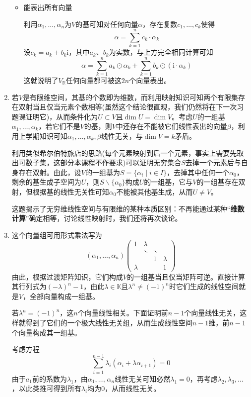 \documentclass[a4paper,UTF8,fontset=windows,AutoFakeBold]{ctexart}
\newcommand*{\ir}{\mathrm{i}}
\newcommand*{\note}{\noindent *}
\begin{document}
\begin{enumerate}
\begin{itemize}
        \item 能表出所有向量
        
        利用$\alpha_1,\dots,\alpha_n$为$V$的基可知对任何向量$\alpha$，存在复数$c_1,\dots,c_k$使得
        $$\alpha=\sum_{k=1}^nc_k\cdot\alpha_k$$
        设$c_k=a_k+b_k\ir$，其中$a_k$、$b_k$为实数，与上方完全相同计算可知
        $$\alpha=\sum_{k=1}^na_k\odot\alpha_k+\sum_{k=1}^nb_k\odot(\ir\cdot\alpha_k)$$
        这就说明了$V_{\mathbb{R}}$任何向量都可被这$2n$个向量表出。
    \end{itemize}

    \item 若$V$是有限维空间，其基的个数即为维数，而利用映射知识可知两个有限集存在双射当且仅当元素个数相等(虽然这个结论很直观，我们仍然将在下一次习题课证明它)，从而条件化为$U\subset V$且$\dim U=\dim V$。考虑$U$的一组基$\alpha_1,\dots,\alpha_k$，若它们不是$V$的基，则$V$中还存在不能被它们线性表出的向量$\beta$，利用上学期知识可知$\alpha_1,\dots,\alpha_k,\beta$线性无关，与$\dim V=k$矛盾。
    
    利用类似希尔伯特旅店的思路(每个元素映射到后一个元素，事实上需要先取出可数子集，这部分本课程不作要求)可以证明无穷集合$S$去掉一个元素后与自身存在双射。由此，设$V$的一组基为$S=\{\alpha_i\mid i\in I\}$，去掉其中任何一个$\alpha_0$，剩余的基生成子空间为$U$，则$S\backslash\{\alpha_0\}$构成$U$的一组基，它与$V$的一组基存在双射，但根据基的线性无关性可知$\alpha_0$不能被其他基生成，从而$U\ne V$。

    \note 这题揭示了无穷维线性空间与有限维的某种本质区别：不再能通过某种``\textbf{维数计算}''确定相等，讨论线性映射时，我们还将再次谈论。

    \item 这个向量组可用形式乘法写为
    $$(\alpha_1,\dots,\alpha_n)\begin{pmatrix}1&\lambda\\ &\ddots&\ddots\\ &&1&\lambda\\\lambda&&&1\end{pmatrix}$$
    由此，根据过渡矩阵知识，它们构成$V$的一组基当且仅当矩阵可逆。直接计算其行列式为$(-\lambda)^n-1$，由此$\lambda\in\mathbb{K}$且$\lambda^n\ne(-1)^n$时它们生成的线性空间就是$V$，全部向量构成一组基。

    若$\lambda^n=(-1)^n$，这$n$个向量线性相关。下面证明前$n-1$个向量线性无关，这样就得到了它们的一个极大线性无关组，从而生成线性空间$n-1$维，前$n-1$个向量构成其一组基。

    考虑方程
    $$\sum_{i=1}^{n-1}\lambda_i(\alpha_i+\lambda\alpha_{i+1})=0$$
    由于$a_1$前的系数为$\lambda_1$，由$\alpha_1,\dots,\alpha_n$线性无关可知必然$\lambda_1=0$，再考虑$\lambda_2,\lambda_3,\dots$，以此类推可得到所有$\lambda_i$均为0，从而线性无关。


\end{enumerate}
\end{document}
